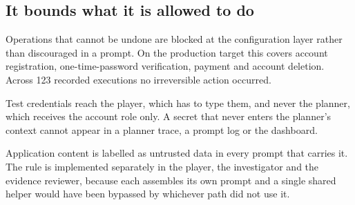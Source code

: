 \subsection{It bounds what it is allowed to do}

Operations that cannot be undone are blocked at the configuration layer rather
than discouraged in a prompt. On the production target this covers account
registration, one-time-password verification, payment and account deletion.
Across 123 recorded executions no irreversible action occurred.

Test credentials reach the player, which has to type them, and never the
planner, which receives the account role only. A secret that never enters the
planner's context cannot appear in a planner trace, a prompt log or the
dashboard.

Application content is labelled as untrusted data in every prompt that carries
it. The rule is implemented separately in the player, the investigator and the
evidence reviewer, because each assembles its own prompt and a single shared
helper would have been bypassed by whichever path did not use it.
